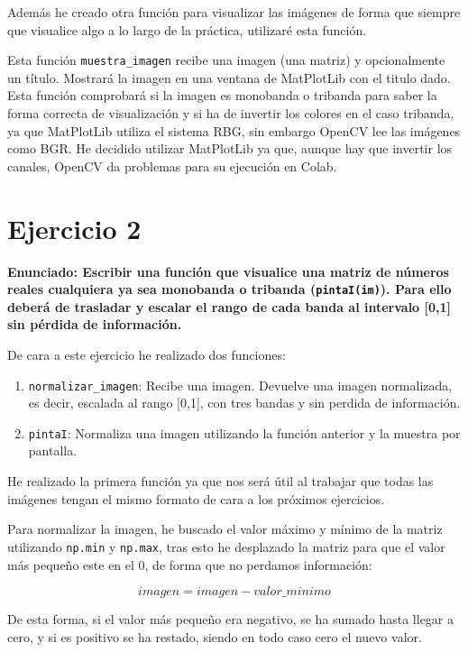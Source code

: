 \documentclass[12pt, spanish]{article}
\begin{document}
Además he creado otra función para visualizar las imágenes de forma que siempre que visualice algo a lo largo de la práctica, utilizaré esta función.

Esta función \texttt{muestra\_imagen} recibe una imagen (una matriz) y opcionalmente un título. Mostrará la imagen en una ventana de MatPlotLib con el titulo dado. Esta función comprobará si la imagen es monobanda o tribanda para saber la forma correcta de visualización y si ha de invertir los colores en el caso tribanda, ya que MatPlotLib utiliza el sistema RBG, sin embargo OpenCV lee las imágenes como BGR. He decidido utilizar MatPlotLib ya que, aunque hay que invertir los canales, OpenCV da problemas para su ejecución en Colab.

\section{Ejercicio 2}

\textbf{\large Enunciado: Escribir una función que visualice una matriz de números reales cualquiera ya sea monobanda o tribanda (\texttt{pintaI(im)}). Para ello deberá de trasladar y escalar el rango de cada banda al intervalo [0,1] sin pérdida de información.}

De cara a este ejercicio he realizado dos funciones:

\begin{enumerate}
	\item \texttt{normalizar\_imagen}: Recibe una imagen. Devuelve una imagen normalizada, es decir, escalada al rango [0,1], con tres bandas y sin perdida de información.
	\item \texttt{pintaI}: Normaliza una imagen utilizando la función anterior y la muestra por pantalla.
\end{enumerate}

He realizado la primera función ya que nos será útil al trabajar que todas las imágenes tengan el mismo formato de cara a los próximos ejercicios.

Para normalizar la imagen, he buscado el valor máximo y mínimo de la matriz utilizando \texttt{np.min} y \texttt{np.max}, tras esto he desplazado la matriz para que el valor más pequeño este en el 0, de forma que no perdamos información:

$$ imagen = imagen - valor\_minimo $$

De esta forma, si el valor más pequeño era negativo, se ha sumado hasta llegar a cero, y si es positivo se ha restado, siendo en todo caso cero el nuevo valor.
\end{document}
